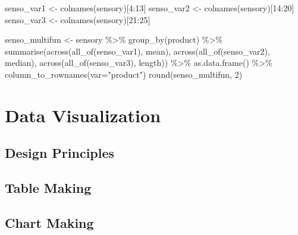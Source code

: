 \documentclass[
]{book}
\newenvironment{Shaded}{\begin{snugshade}}{\end{snugshade}}
\newcommand{\AttributeTok}[1]{\textcolor[rgb]{0.77,0.63,0.00}{#1}}
\newcommand{\DecValTok}[1]{\textcolor[rgb]{0.00,0.00,0.81}{#1}}
\newcommand{\FunctionTok}[1]{\textcolor[rgb]{0.00,0.00,0.00}{#1}}
\newcommand{\NormalTok}[1]{#1}
\newcommand{\OtherTok}[1]{\textcolor[rgb]{0.56,0.35,0.01}{#1}}
\newcommand{\SpecialCharTok}[1]{\textcolor[rgb]{0.00,0.00,0.00}{#1}}
\newcommand{\StringTok}[1]{\textcolor[rgb]{0.31,0.60,0.02}{#1}}
\begin{document}
\begin{Shaded}
\begin{Highlighting}[]
\NormalTok{senso\_var1 }\OtherTok{\textless{}{-}} \FunctionTok{colnames}\NormalTok{(sensory)[}\DecValTok{4}\SpecialCharTok{:}\DecValTok{13}\NormalTok{]}
\NormalTok{senso\_var2 }\OtherTok{\textless{}{-}} \FunctionTok{colnames}\NormalTok{(sensory)[}\DecValTok{14}\SpecialCharTok{:}\DecValTok{20}\NormalTok{]}
\NormalTok{senso\_var3 }\OtherTok{\textless{}{-}} \FunctionTok{colnames}\NormalTok{(sensory)[}\DecValTok{21}\SpecialCharTok{:}\DecValTok{25}\NormalTok{]}

\NormalTok{senso\_multifun }\OtherTok{\textless{}{-}}\NormalTok{ sensory }\SpecialCharTok{\%\textgreater{}\%} 
  \FunctionTok{group\_by}\NormalTok{(product) }\SpecialCharTok{\%\textgreater{}\%} 
  \FunctionTok{summarise}\NormalTok{(}\FunctionTok{across}\NormalTok{(}\FunctionTok{all\_of}\NormalTok{(senso\_var1), mean),}
            \FunctionTok{across}\NormalTok{(}\FunctionTok{all\_of}\NormalTok{(senso\_var2), median),}
            \FunctionTok{across}\NormalTok{(}\FunctionTok{all\_of}\NormalTok{(senso\_var3), length)) }\SpecialCharTok{\%\textgreater{}\%} 
  \FunctionTok{as.data.frame}\NormalTok{() }\SpecialCharTok{\%\textgreater{}\%} 
  \FunctionTok{column\_to\_rownames}\NormalTok{(}\AttributeTok{var=}\StringTok{"product"}\NormalTok{)}
\FunctionTok{round}\NormalTok{(senso\_multifun, }\DecValTok{2}\NormalTok{)}
\end{Highlighting}
\end{Shaded}

\hypertarget{data-viz}{%
\chapter{Data Visualization}\label{data-viz}}

\hypertarget{design-principles}{%
\section{Design Principles}\label{design-principles}}

\hypertarget{table-making}{%
\section{Table Making}\label{table-making}}

\hypertarget{chart-making}{%
\section{Chart Making}\label{chart-making}}
\end{document}
